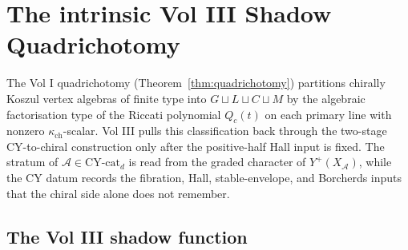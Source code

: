 %

\providecommand{\cA}{\mathcal{A}}
\providecommand{\cC}{\mathcal{C}}
\providecommand{\cO}{\mathcal{O}}
\providecommand{\cH}{\mathcal{H}}
\providecommand{\CY}{\mathrm{CY}}
\providecommand{\CYcat}{\mathrm{CY}\text{-}\mathrm{cat}}
\providecommand{\ChirAlg}{\mathrm{ChirAlg}}
\providecommand{\CoHA}{\mathrm{CoHA}}
\providecommand{\Yplus}{Y^{+}}
\providecommand{\SpCh}{\mathrm{Sp}^{\mathrm{ch}}}
\providecommand{\PhiFA}{\Phi^{\mathrm{FA}}}
\providecommand{\Etwo}{E_2}
\providecommand{\Eone}{E_1}

\section{The intrinsic Vol III Shadow Quadrichotomy}
\label{sec:vol3-shadow-stratification}

The Vol I quadrichotomy (Theorem~\ref{thm:quadrichotomy}) partitions
chirally Koszul vertex algebras of finite type into
$G \sqcup L \sqcup C \sqcup M$ by the algebraic factorisation type of
the Riccati polynomial $Q_{c}(t)$ on each primary line with nonzero
$\kappa_{\mathrm{ch}}$-scalar. Vol III pulls this classification back
through the two-stage CY-to-chiral construction only after the
positive-half Hall input is fixed. The stratum of
$\cA \in \CYcat_{d}$ is read from the graded character of
$\Yplus(X_{\cA})$, while the CY datum records the fibration, Hall,
stable-envelope, and Borcherds inputs that the chiral side alone does
not remember.

\subsection{The Vol III shadow function}
\label{subsec:vol3-shadow-function}

